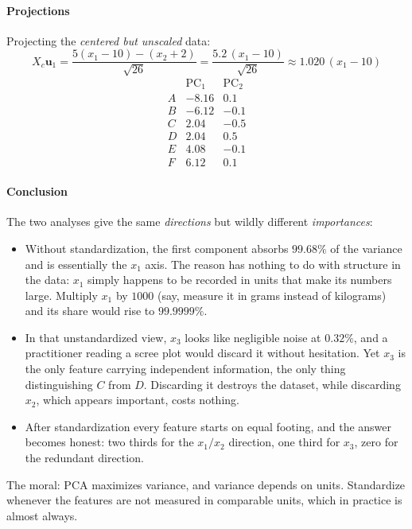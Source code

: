 \documentclass[]{article}
\begin{document}
	\paragraph{Projections}\mbox{}

	Projecting the \emph{centered but unscaled} data:
	$$
	X_c \mathbf{u}_1 = \frac{5(x_1 - 10) - (x_2 + 2)}{\sqrt{26}} = \frac{5.2\,(x_1 - 10)}{\sqrt{26}} \approx 1.020\,(x_1 - 10)
	$$
	$$
	\begin{array}{c|rr}
		& \text{PC}_1 & \text{PC}_2 \\ \hline
		A & -8.16 & 0.1 \\
		B & -6.12 & -0.1 \\
		C & 2.04 & -0.5 \\
		D & 2.04 & 0.5 \\
		E & 4.08 & -0.1 \\
		F & 6.12 & 0.1
	\end{array}
	$$

	\paragraph{Conclusion}\mbox{}

	The two analyses give the same \emph{directions} but wildly different \emph{importances}:
	\begin{itemize}
		\item Without standardization, the first component absorbs $99.68\%$ of the variance and is essentially the $x_1$ axis.
		The reason has nothing to do with structure in the data: $x_1$ simply happens to be recorded in units that make its numbers large.
		Multiply $x_1$ by $1000$ (say, measure it in grams instead of kilograms) and its share would rise to $99.9999\%$.
		\item In that unstandardized view, $x_3$ looks like negligible noise at $0.32\%$, and a practitioner reading a scree plot would discard it without hesitation.
		Yet $x_3$ is the only feature carrying independent information, the only thing distinguishing $C$ from $D$.
		Discarding it destroys the dataset, while discarding $x_2$, which appears important, costs nothing.
		\item After standardization every feature starts on equal footing, and the answer becomes honest: two thirds for the $x_1/x_2$ direction, one third for $x_3$, zero for the redundant direction.
	\end{itemize}
	The moral: PCA maximizes variance, and variance depends on units.
	Standardize whenever the features are not measured in comparable units, which in practice is almost always.
\end{document}
